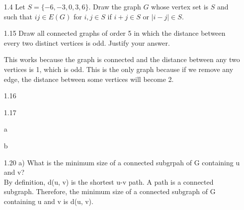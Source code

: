 \documentclass[12pt]{article}
\begin{document}
\begin{enumerate}
\item[1.4] Let $S = \{-6, -3, 0, 3, 6\}$. Draw the graph $G$ whose vertex set is $S$ and such that $ij \in E(G)$ for $i, j \in S$ if $i + j \in S$ or $|i - j| \in S$.

\begin{center}
\end{center}
    
 \item[1.15] Draw all connected graphs of order 5 in which the distance between every two distinct vertices is odd.  Justify your answer.
    \begin{center}
\end{center}
\noindent
This works because the graph is connected and the distance between any two vertices is 1, which is odd.  This is the only graph because if we remove any edge, the distance between some vertices will become 2.

\item[1.16]

\item[1.17]
\item[a] 
\item[b] 

\item[1.20 a)] What is the minimum size of a connected subgrpah of G containing u and v? 
\\
\noindent
By definition, d(u, v) is the shortest u-v path. A path is
a connected subgraph. Therefore, the minimum size of a connected subgraph of G containing u and v is 
d(u, v).



\end{enumerate}
\end{document}
